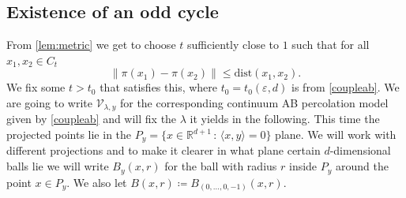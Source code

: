 \documentclass[11pt]{article}%
\newcommand{\norm}[1]{\ensuremath{\left\|#1\right\|}}
\newcommand{\eps}{\varepsilon}
\newcommand{\RR}{\mathbb{R}}
\newcommand{\dists}{{\mathrm{dist}}}
\begin{document}
\subsection{Existence of an odd cycle}
From \cref{lem:metric} we get to choose $ t $ sufficiently close to $ 1 $ such that for all $ x_1,x_2\in C_t $
\begin{equation}\label{tcloseto1}
	\norm{\pi(x_1)-\pi(x_2)}\leq \dists(x_1,x_2).
\end{equation}
We fix some $ t>t_0 $ that satisfies this, where $t_0=t_0(\eps,d)$ is from \cref{coupleab}. We are going to write $ \mathcal{V}_{\lambda,y} $ for the corresponding continuum AB percolation model given by \cref{coupleab} and will fix the $\lambda$ it yields in the following. This time the projected points lie in the $ P_y= \{x\in \RR^{d+1} \,:\, \langle x,y\rangle=0\} $ plane. We will work with different projections and to make it clearer in what plane certain $ d $-dimensional balls lie we will write $ B_y(x,r) $ for the ball with radius $ r $ inside $ P_y $ around the point $ x\in P_y $. We also let $ B(x,r)\coloneqq B_{(0,\dots,0,-1)}(x,r) $.\\
\end{document}
